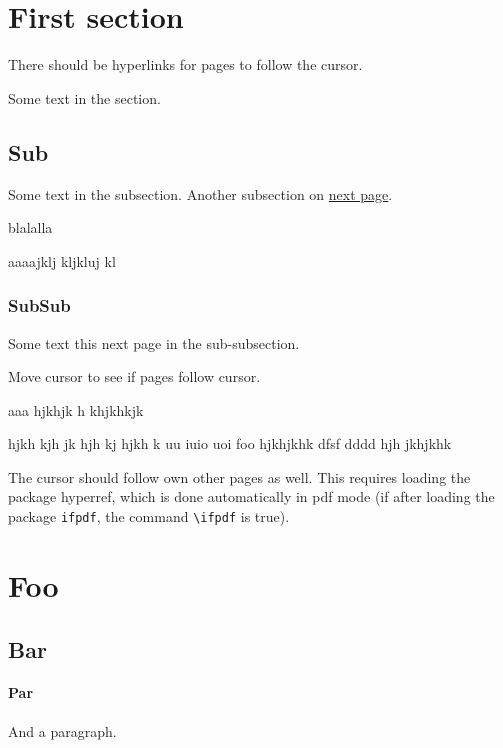 \documentclass{article}
\begin{document}
\section{First section}

There should be hyperlinks for pages to follow the cursor. 

\tableofcontents



Some text in the section.  
 
\subsection {Sub}

Some text in the subsection. 
Another subsection on \hyperlink{next}{next page}.


blalalla  
\newpage

aaaajklj kljkluj kl
\subsubsection {SubSub} 

Some text this \hypertarget{next}{next page} in the sub-subsection. 

Move cursor to see if pages follow cursor.

\newpage

aaa hjkhjk h
\newpage
khjkhkjk

hjkh kjh jk  hjh kj hjkh k uu iuio uoi foo
hjkhjkhk  dfsf dddd hjh jkhjkhk


The cursor should follow own other pages as well.
This requires loading the package hyperref, which is done
automatically in pdf mode (if after loading the package \texttt{ifpdf}, 
the command \verb"\ifpdf" is true). 



\section{Foo}

\subsection {Bar}


\paragraph {Par}

And a paragraph.
\end{document}
